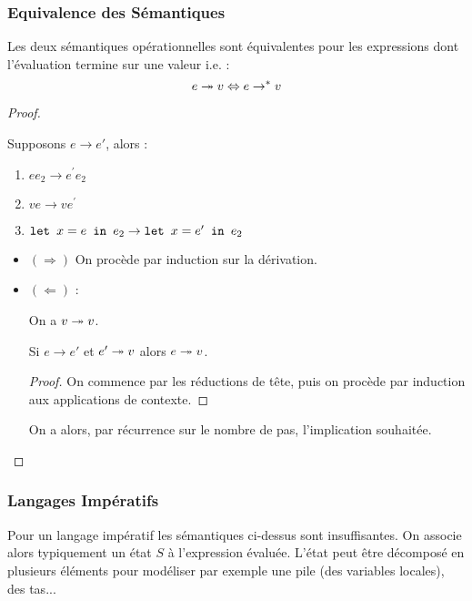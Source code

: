 \documentclass{cours}
\begin{document}
\subsubsection{Equivalence des Sémantiques}
\begin{theorem}
    Les deux sémantiques opérationnelles sont équivalentes pour les expressions dont l'évaluation termine sur une valeur i.e. :
    \[
        e \twoheadrightarrow v \Leftrightarrow e \rightarrow^{*} v    
    \]    
\end{theorem}
\begin{proof}
    \begin{lemma}
        Supposons $e \rightarrow e'$, alors :        
        \begin{enumerate}
            \item $e e_{2} \rightarrow e^{'} e_{2}$
            \item $v e \rightarrow v e^{'}$
            \item $\texttt{let } x = e \texttt{ in } e_{2} \rightarrow \texttt{let } x = e' \texttt{ in } e_{2}$
        \end{enumerate}
    \end{lemma}
    \begin{itemize}
        \item $(\Rightarrow)$ On procède par induction sur la dérivation. 
        \item $(\Leftarrow)$ :
        \begin{lemma}
           On a $v \twoheadrightarrow v$.
        \end{lemma}
        \begin{lemma}
            Si $e \rightarrow e'$ et $e' \twoheadrightarrow v$ alors $e \twoheadrightarrow v$.
        \end{lemma}
        \begin{proof}
            On commence par les réductions de tête, puis on procède par induction aux applications de contexte. 
        \end{proof}
        On a alors, par récurrence sur le nombre de pas, l'implication souhaitée. 
    \end{itemize}
\end{proof}

\subsubsection{Langages Impératifs}
Pour un langage impératif les sémantiques ci-dessus sont insuffisantes. On associe alors typiquement un état $S$ à l'expression évaluée. L'état peut être décomposé en plusieurs éléments pour modéliser par exemple une pile (des variables locales), des tas... 
\end{document}
